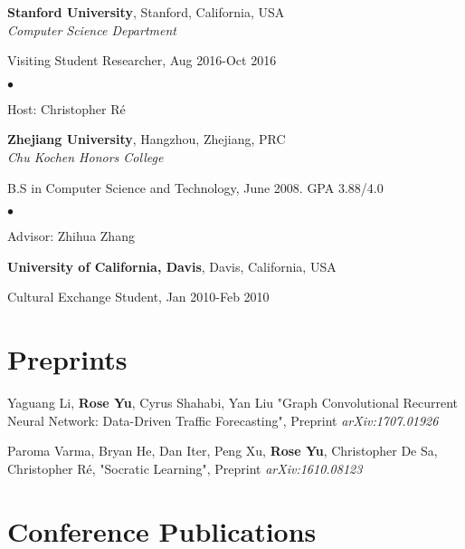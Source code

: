 \documentclass[margin,line]{res}
\newenvironment{list1}{
  \begin{list}{\ding{113}}{%
      \setlength{\itemsep}{0in}
      \setlength{\parsep}{0in} \setlength{\parskip}{0in}
      \setlength{\topsep}{0in} \setlength{\partopsep}{0in} 
      \setlength{\leftmargin}{0.17in}}}{\end{list}}
\newenvironment{list2}{
  \begin{list}{$\bullet$}{%
      \setlength{\itemsep}{0in}
      \setlength{\parsep}{0in} \setlength{\parskip}{0in}
      \setlength{\topsep}{0in} \setlength{\partopsep}{0in} 
      \setlength{\leftmargin}{0.2in}}}{\end{list}}
\begin{document}
\begin{resume}
\begin{list1}
\vspace*{.05in}
\end{list1}
{\bf Stanford University}, Stanford, California, USA\\
{\em Computer Science Department } 
\begin{list1}
	\item[] Visiting Student Researcher,  Aug 2016-Oct 2016
	\begin{list2}
		\vspace*{.05in}
		\item Host:  Christopher R\'e
	\end{list2}
\end{list1}

{\bf Zhejiang University}, Hangzhou, Zhejiang, PRC\\
{\em Chu Kochen Honors College} 
\begin{list1}
\item[] B.S in Computer Science and Technology,  June 2008. GPA 3.88/4.0
\begin{list2}
\vspace*{.05in}
\item Advisor:  Zhihua Zhang
\end{list2}
\end{list1}

{\bf University of California, Davis}, Davis, California, USA\\
\vspace*{-.1in}
\begin{list1}
\item[] Cultural Exchange Student, Jan 2010-Feb 2010
\end{list1}




\section{\sc Preprints}

Yaguang Li, {\bf Rose Yu}, Cyrus Shahabi, Yan Liu
"Graph Convolutional Recurrent Neural Network: Data-Driven Traffic Forecasting",
Preprint \textit{arXiv:1707.01926 }

Paroma Varma, Bryan He, Dan Iter, Peng Xu, {\bf Rose Yu}, Christopher De Sa,  Christopher R\'e,  "Socratic Learning",
Preprint \textit{arXiv:1610.08123}

\section{\sc Conference Publications}


\end{resume}
\end{document}
